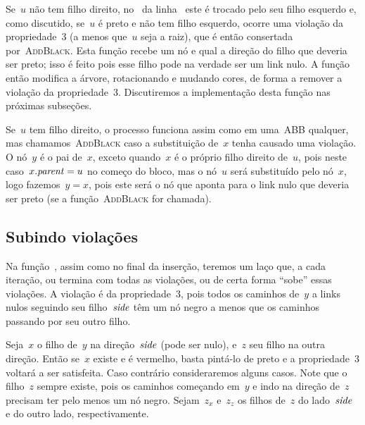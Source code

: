 \documentclass[main.tex]{subfiles}
\begin{document}
Se~$u$ não tem filho direito, no~ da linha~ este é trocado pelo seu filho esquerdo e, como discutido, se~$u$ é preto e não tem filho esquerdo, ocorre uma violação da propriedade~3 (a menos que~$u$ seja a raiz), que é então consertada por~\textsc{AddBlack}. Esta função recebe um nó e qual a direção do filho que deveria ser preto; isso é feito pois esse filho pode na verdade ser um link nulo. A função então modifica a árvore, rotacionando e mudando cores, de forma a remover a violação   da propriedade~3. Discutiremos a implementação desta função nas próximas subseções.

Se~$u$ tem filho direito, o processo funciona assim como em uma~ABB qualquer, mas chamamos~\textsc{AddBlack} caso a substituição de~$x$ tenha causado uma violação. O nó~$y$ é o pai de~$x$, exceto quando~$x$ é o próprio filho direito de~$u$, pois neste caso~${x.\mathit{parent} = u}$ no começo do bloco, mas o nó~$u$ será substituído pelo nó~$x$, logo fazemos~$y = x$, pois este será o nó que aponta para o link nulo que deveria ser preto (se a função~\textsc{AddBlack} for chamada).

\subsection{Subindo violações}

Na função~, assim como no final da inserção, teremos um laço que, a cada iteração, ou termina com todas as violações, ou de certa forma ``sobe'' essas violações. A violação é da propriedade~3, pois todos os caminhos de~$y$ a links nulos seguindo seu filho~$\mathit{side}$ têm um nó negro a menos que os caminhos passando por seu outro filho.

Seja~$x$ o filho de~$y$ na direção~$\mathit{side}$ (pode ser nulo), e~$z$ seu filho na outra direção. Então se~$x$ existe e é vermelho, basta pintá-lo de preto e a propriedade~3 voltará a ser satisfeita. Caso contrário consideraremos alguns casos. Note que o filho~$z$ sempre existe, pois os caminhos começando em~$y$ e indo na direção de~$z$ precisam ter pelo menos um nó negro. Sejam~$z_x$ e~$z_z$ os filhos de~$z$ do lado~$\mathit{side}$ e do outro lado, respectivamente.
\end{document}
